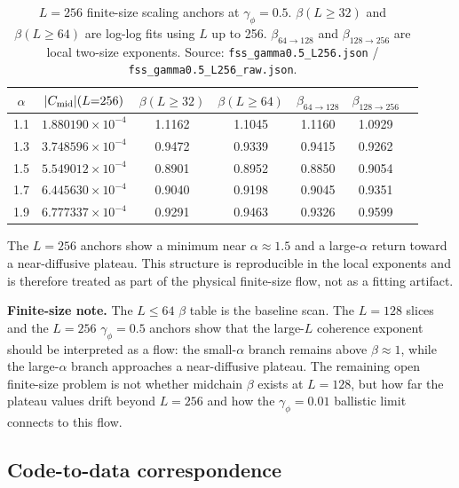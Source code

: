 \documentclass[aps,prb,twocolumn,superscriptaddress]{revtex4-2}
\begin{document}
\begin{table}[h]
\caption{$L=256$ finite-size scaling anchors at $\gamma_\phi = 0.5$. $\beta(L{\geq}32)$ and $\beta(L{\geq}64)$ are log-log fits using $L$ up to 256. $\beta_{64\to128}$ and $\beta_{128\to256}$ are local two-size exponents. Source: \texttt{fss\_gamma0.5\_L256.json} / \texttt{fss\_gamma0.5\_L256\_raw.json}.}
\label{tab:S7}
\begin{ruledtabular}
\begin{tabular}{ccccccc}
$\alpha$ & $|C_{\rm mid}|(L{=}256)$ & $\beta(L{\geq}32)$ & $\beta(L{\geq}64)$ & $\beta_{64\to128}$ & $\beta_{128\to256}$ \\
\hline
1.1 & $1.880190\times10^{-4}$ & 1.1162 & 1.1045 & 1.1160 & 1.0929 \\
1.3 & $3.748596\times10^{-4}$ & 0.9472 & 0.9339 & 0.9415 & 0.9262 \\
1.5 & $5.549012\times10^{-4}$ & 0.8901 & 0.8952 & 0.8850 & 0.9054 \\
1.7 & $6.445630\times10^{-4}$ & 0.9040 & 0.9198 & 0.9045 & 0.9351 \\
1.9 & $6.777337\times10^{-4}$ & 0.9291 & 0.9463 & 0.9326 & 0.9599 \\
\end{tabular}
\end{ruledtabular}
\end{table}

The $L=256$ anchors show a minimum near $\alpha \approx 1.5$ and a large-$\alpha$ return toward a near-diffusive plateau. This structure is reproducible in the local exponents and is therefore treated as part of the physical finite-size flow, not as a fitting artifact.

\textbf{Finite-size note.} The $L{\leq}64$ $\beta$ table is the baseline scan. The $L=128$ slices and the $L=256$ $\gamma_\phi = 0.5$ anchors show that the large-$L$ coherence exponent should be interpreted as a flow: the small-$\alpha$ branch remains above $\beta \approx 1$, while the large-$\alpha$ branch approaches a near-diffusive plateau. The remaining open finite-size problem is not whether midchain $\beta$ exists at $L=128$, but how far the plateau values drift beyond $L=256$ and how the $\gamma_\phi = 0.01$ ballistic limit connects to this flow.

\subsection*{Code-to-data correspondence}
\end{document}
